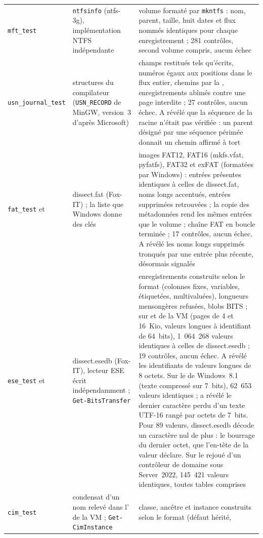 \documentclass[11pt,a4paper,oneside]{report}
\begin{document}
\begin{longtable}{@{}L{4.6cm}L{3.8cm}L{6.6cm}@{}}
\texttt{mft\_test} & \texttt{ntfsinfo} (ntfs-3g), implémentation NTFS indépendante &
  volume formaté par \texttt{mkntfs} : nom, parent, taille, huit dates et flux
  nommés identiques pour chaque enregistrement ; 281 contrôles, second volume compris, aucun échec \\
\texttt{usn\_journal\_test} & structures du compilateur (\texttt{USN\_RECORD}
  de MinGW, version~3 d'après Microsoft) &
  champs restitués tels qu'écrits, numéros égaux aux positions dans le flux
  entier, chemins par la , enregistrements abîmés contre une
  page interdite ; 27 contrôles, aucun échec. A révélé que la séquence de la
  racine n'était pas vérifiée : un parent désigné par une séquence périmée
  donnait un chemin affirmé à tort \\
\texttt{fat\_test} et  &
  dissect.fat (Fox-IT) ; la liste que Windows donne des clés &
  images FAT12, FAT16 (mkfs.vfat, pyfatfs), FAT32 et exFAT (formatées par
  Windows) : entrées présentes identiques à celles de dissect.fat, noms longs
  accentués, entrées supprimées retrouvées ; la copie des métadonnées rend
  les mêmes entrées que le volume ; chaîne FAT en boucle terminée ; 17
  contrôles, aucun échec. A révélé les noms longs supprimés tronqués par une
  entrée plus récente, désormais signalés \\
\texttt{ese\_test} et  &
  dissect.esedb (Fox-IT), lecteur ESE écrit indépendamment ; \texttt{Get-BitsTransfer} &
  enregistrements construits selon le format (colonnes fixes, variables,
  étiquetées, multivaluées), longueurs mensongères refusées, blobs BITS ; sur
   et  de la VM (pages de 4 et 16~Kio,
  valeurs longues à identifiant de 64~bits), 1~064~268 valeurs identiques à
  celles de dissect.esedb ; 19 contrôles, aucun échec. A révélé les
  identifiants de valeurs longues de 8 octets. Sur le 
  de Windows~8.1 (texte compressé sur 7~bits), 62~653 valeurs identiques ; a
  révélé le dernier caractère perdu d'un texte UTF-16 rangé par octets de
  7~bits. Pour 89 valeurs, dissect.esedb décode un caractère nul de plus : le
  bourrage du dernier octet, que l'en-tête de la valeur déclare. Sur le
   rejoué d'un contrôleur de domaine sous Server~2022, 145~421
  valeurs identiques, toutes tables comprises \\
\texttt{cim\_test} & condensat d'un nom relevé dans l'
  de la VM ; \texttt{Get-CimInstance} &
  classe, ancêtre et instance construits selon le format (défaut hérité,

\end{longtable}
\end{document}
